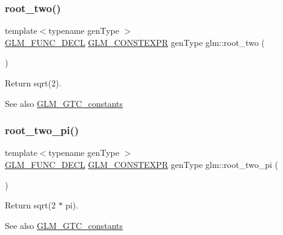 \subsubsection{\texorpdfstring{root\+\_\+two()}{root\_two()}}
{\footnotesize\ttfamily template$<$typename gen\+Type $>$ \\
\hyperlink{setup_8hpp_ab2d052de21a70539923e9bcbf6e83a51}{G\+L\+M\+\_\+\+F\+U\+N\+C\+\_\+\+D\+E\+CL} \hyperlink{setup_8hpp_a08b807947b47031d3a511f03f89645ad}{G\+L\+M\+\_\+\+C\+O\+N\+S\+T\+E\+X\+PR} gen\+Type glm\+::root\+\_\+two (\begin{DoxyParamCaption}{ }\end{DoxyParamCaption})}

Return sqrt(2). \begin{DoxySeeAlso}{See also}
\hyperlink{group__gtc__constants}{G\+L\+M\+\_\+\+G\+T\+C\+\_\+constants} 
\end{DoxySeeAlso}
\mbox{\label{group__gtc__constants_ga2bcedc575039fe0cd765742f8bbb0bd3}} 
\subsubsection{\texorpdfstring{root\+\_\+two\+\_\+pi()}{root\_two\_pi()}}
{\footnotesize\ttfamily template$<$typename gen\+Type $>$ \\
\hyperlink{setup_8hpp_ab2d052de21a70539923e9bcbf6e83a51}{G\+L\+M\+\_\+\+F\+U\+N\+C\+\_\+\+D\+E\+CL} \hyperlink{setup_8hpp_a08b807947b47031d3a511f03f89645ad}{G\+L\+M\+\_\+\+C\+O\+N\+S\+T\+E\+X\+PR} gen\+Type glm\+::root\+\_\+two\+\_\+pi (\begin{DoxyParamCaption}{ }\end{DoxyParamCaption})}

Return sqrt(2 $\ast$ pi). \begin{DoxySeeAlso}{See also}
\hyperlink{group__gtc__constants}{G\+L\+M\+\_\+\+G\+T\+C\+\_\+constants} 
\end{DoxySeeAlso}
\mbox{\label{group__gtc__constants_ga3077c6311010a214b69ddc8214ec13b5}} 
